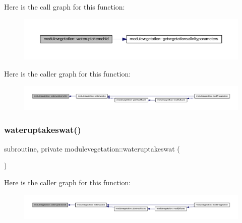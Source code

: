 Here is the call graph for this function\+:\nopagebreak
\begin{figure}[H]
\begin{center}
\leavevmode
\includegraphics[width=350pt]{namespacemodulevegetation_ac76c877ab32f2ff96b234d3ba23b4dbc_cgraph}
\end{center}
\end{figure}
Here is the caller graph for this function\+:\nopagebreak
\begin{figure}[H]
\begin{center}
\leavevmode
\includegraphics[width=350pt]{namespacemodulevegetation_ac76c877ab32f2ff96b234d3ba23b4dbc_icgraph}
\end{center}
\end{figure}
\mbox{\label{namespacemodulevegetation_abf633925bf9ba7db34dd3d63300fe43d}} 
\subsubsection{\texorpdfstring{wateruptakeswat()}{wateruptakeswat()}}
{\footnotesize\ttfamily subroutine, private modulevegetation\+::wateruptakeswat (\begin{DoxyParamCaption}{ }\end{DoxyParamCaption})\hspace{0.3cm}{\ttfamily [private]}}

Here is the caller graph for this function\+:\nopagebreak
\begin{figure}[H]
\begin{center}
\leavevmode
\includegraphics[width=350pt]{namespacemodulevegetation_abf633925bf9ba7db34dd3d63300fe43d_icgraph}
\end{center}
\end{figure}
\mbox{\label{namespacemodulevegetation_ad1ed23055b336a8f8253483f2289121b}} 
